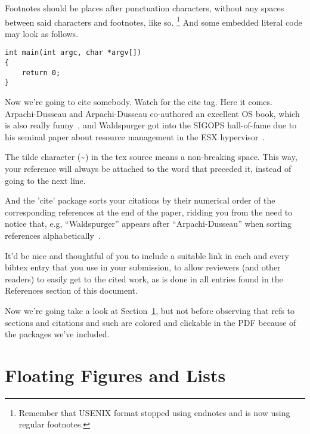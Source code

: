 Footnotes should be places after punctuation characters, without any
spaces between said characters and footnotes, like so.%
\footnote{Remember that USENIX format stopped using endnotes and is
  now using regular footnotes.} And some embedded literal code may
look as follows.

\begin{verbatim}
int main(int argc, char *argv[]) 
{
    return 0;
}
\end{verbatim}
Now we're going to cite somebody. Watch for the cite tag. Here it
comes. Arpachi-Dusseau and Arpachi-Dusseau co-authored an excellent OS
book, which is also really funny~\cite{arpachiDusseau18:osbook}, and
Waldspurger got into the SIGOPS hall-of-fame due to his seminal paper
about resource management in the ESX hypervisor~\cite{waldspurger02}.

The tilde character (\~{}) in the tex source means a non-breaking
space. This way, your reference will always be attached to the word
that preceded it, instead of going to the next line.

And the 'cite' package sorts your citations by their numerical order
of the corresponding references at the end of the paper, ridding you
from the need to notice that, e.g, ``Waldspurger'' appears after
``Arpachi-Dusseau'' when sorting references
alphabetically~\cite{waldspurger02,arpachiDusseau18:osbook}. 

It'd be nice and thoughtful of you to include a suitable link in each
and every bibtex entry that you use in your submission, to allow
reviewers (and other readers) to easily get to the cited work, as is
done in all entries found in the References section of this document.

Now we're going take a look at Section~\ref{sec:figs}, but not before
observing that refs to sections and citations and such are colored and
clickable in the PDF because of the packages we've included.

\section{Floating Figures and Lists}
\label{sec:figs}


